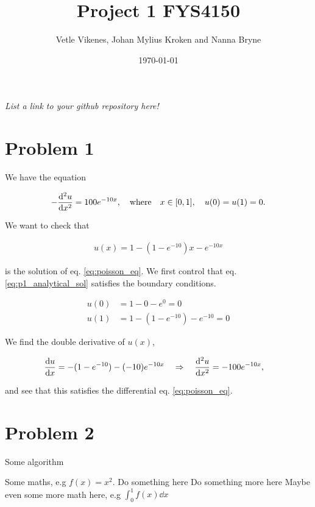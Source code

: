 \documentclass[english,notitlepage]{revtex4-1}  %
\begin{document}
\title{Project 1 FYS4150}      %
\author{Vetle Vikenes, Johan Mylius Kroken and Nanna Bryne}          %
\date{\today}                             %
\noaffiliation                            %


\maketitle 
    
\textit{List a link to your github repository here!}
    
\section*{Problem 1}

We have the equation 

\begin{align}\label{eq:poisson_eq}
    -\dv[2]{u}{x} =  100e^{-10x}, \quad \text{where} \quad x\in [0,1], \quad u(0)=u(1)=0.
\end{align}


We want to check that 

\begin{align}\label{eq:p1_analytical_sol}
    u(x) = 1 - (1-e^{-10})x - e^{-10x}
\end{align}

is the solution of eq. \ref{eq:poisson_eq}. We first control that eq. \ref{eq:p1_analytical_sol} satisfies the boundary conditions. 

\begin{align*}
    u(0) &= 1 - 0 - e^{0} = 0 \\
    u(1) &= 1 - (1-e^{-10}) - e^{-10} = 0
\end{align*}
 
We find the double derivative of $u(x)$,

\begin{align*}
    \dv{u}{x} &= -(1-e^{-10}) - (-10)e^{-10x} \quad \Rightarrow \quad \dv[2]{u}{x} = -100e^{-10x},
\end{align*}

and see that this satisfies the differential eq. \ref{eq:poisson_eq}.


\section*{Problem 2}

\begin{algorithm}[H]
    \caption{Some algorithm}\label{algo:midpoint_rule}
    \begin{algorithmic}
        \State Some maths, e.g $f(x) = x^2$.  
        \State Do something here 
        \EndFor
        \State Do something more here 
        \EndWhile
        \State Maybe even some more math here, e.g $\int_0^1 f(x) \dd x$
    \end{algorithmic}
\end{algorithm}
   
\end{document}
